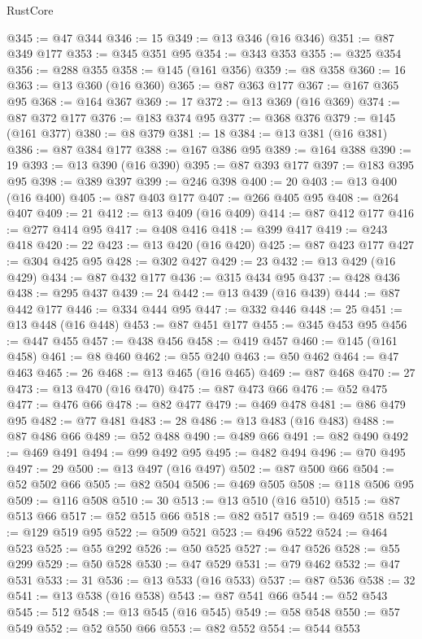 \begin{lexlean}{RustCore}
\begin{coremodule}
@345 := @47 @344
@346 := 15
@349 := @13 @346 (@16 @346)
@351 := @87 @349 @177
@353 := @345 @351 @95
@354 := @343 @353
@355 := @325 @354
@356 := @288 @355
@358 := @145 (@161 @356)
@359 := @8 @358
@360 := 16
@363 := @13 @360 (@16 @360)
@365 := @87 @363 @177
@367 := @167 @365 @95
@368 := @164 @367
@369 := 17
@372 := @13 @369 (@16 @369)
@374 := @87 @372 @177
@376 := @183 @374 @95
@377 := @368 @376
@379 := @145 (@161 @377)
@380 := @8 @379
@381 := 18
@384 := @13 @381 (@16 @381)
@386 := @87 @384 @177
@388 := @167 @386 @95
@389 := @164 @388
@390 := 19
@393 := @13 @390 (@16 @390)
@395 := @87 @393 @177
@397 := @183 @395 @95
@398 := @389 @397
@399 := @246 @398
@400 := 20
@403 := @13 @400 (@16 @400)
@405 := @87 @403 @177
@407 := @266 @405 @95
@408 := @264 @407
@409 := 21
@412 := @13 @409 (@16 @409)
@414 := @87 @412 @177
@416 := @277 @414 @95
@417 := @408 @416
@418 := @399 @417
@419 := @243 @418
@420 := 22
@423 := @13 @420 (@16 @420)
@425 := @87 @423 @177
@427 := @304 @425 @95
@428 := @302 @427
@429 := 23
@432 := @13 @429 (@16 @429)
@434 := @87 @432 @177
@436 := @315 @434 @95
@437 := @428 @436
@438 := @295 @437
@439 := 24
@442 := @13 @439 (@16 @439)
@444 := @87 @442 @177
@446 := @334 @444 @95
@447 := @332 @446
@448 := 25
@451 := @13 @448 (@16 @448)
@453 := @87 @451 @177
@455 := @345 @453 @95
@456 := @447 @455
@457 := @438 @456
@458 := @419 @457
@460 := @145 (@161 @458)
@461 := @8 @460
@462 := @55 @240
@463 := @50 @462
@464 := @47 @463
@465 := 26
@468 := @13 @465 (@16 @465)
@469 := @87 @468
@470 := 27
@473 := @13 @470 (@16 @470)
@475 := @87 @473 @66
@476 := @52 @475
@477 := @476 @66
@478 := @82 @477
@479 := @469 @478
@481 := @86 @479 @95
@482 := @77 @481
@483 := 28
@486 := @13 @483 (@16 @483)
@488 := @87 @486 @66
@489 := @52 @488
@490 := @489 @66
@491 := @82 @490
@492 := @469 @491
@494 := @99 @492 @95
@495 := @482 @494
@496 := @70 @495
@497 := 29
@500 := @13 @497 (@16 @497)
@502 := @87 @500 @66
@504 := @52 @502 @66
@505 := @82 @504
@506 := @469 @505
@508 := @118 @506 @95
@509 := @116 @508
@510 := 30
@513 := @13 @510 (@16 @510)
@515 := @87 @513 @66
@517 := @52 @515 @66
@518 := @82 @517
@519 := @469 @518
@521 := @129 @519 @95
@522 := @509 @521
@523 := @496 @522
@524 := @464 @523
@525 := @55 @292
@526 := @50 @525
@527 := @47 @526
@528 := @55 @299
@529 := @50 @528
@530 := @47 @529
@531 := @79 @462
@532 := @47 @531
@533 := 31
@536 := @13 @533 (@16 @533)
@537 := @87 @536
@538 := 32
@541 := @13 @538 (@16 @538)
@543 := @87 @541 @66
@544 := @52 @543
@545 := 512
@548 := @13 @545 (@16 @545)
@549 := @58 @548
@550 := @57 @549
@552 := @52 @550 @66
@553 := @82 @552
@554 := @544 @553

\end{coremodule}
\end{lexlean}
